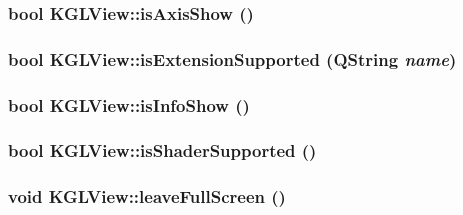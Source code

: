 \hypertarget{class_k_g_l_view_865bf8ed1692292d820f13b2321e799d}{
\subsubsection[{isAxisShow}]{\setlength{\rightskip}{0pt plus 5cm}bool KGLView::isAxisShow ()}}
\label{class_k_g_l_view_865bf8ed1692292d820f13b2321e799d}


\hypertarget{class_k_g_l_view_c2cc43b86ba6526450d7e9fa3403a484}{
\subsubsection[{isExtensionSupported}]{\setlength{\rightskip}{0pt plus 5cm}bool KGLView::isExtensionSupported (QString {\em name})}}
\label{class_k_g_l_view_c2cc43b86ba6526450d7e9fa3403a484}


\hypertarget{class_k_g_l_view_369ac3eaa08535c8b333d6b8c3793ea1}{
\subsubsection[{isInfoShow}]{\setlength{\rightskip}{0pt plus 5cm}bool KGLView::isInfoShow ()}}
\label{class_k_g_l_view_369ac3eaa08535c8b333d6b8c3793ea1}


\hypertarget{class_k_g_l_view_c1f4d61a7d289074b048ff5791bb3eb5}{
\subsubsection[{isShaderSupported}]{\setlength{\rightskip}{0pt plus 5cm}bool KGLView::isShaderSupported ()}}
\label{class_k_g_l_view_c1f4d61a7d289074b048ff5791bb3eb5}


\hypertarget{class_k_g_l_view_996e019a804dcf51749ea900cc02cb83}{
\subsubsection[{leaveFullScreen}]{\setlength{\rightskip}{0pt plus 5cm}void KGLView::leaveFullScreen ()}}
\label{class_k_g_l_view_996e019a804dcf51749ea900cc02cb83}


